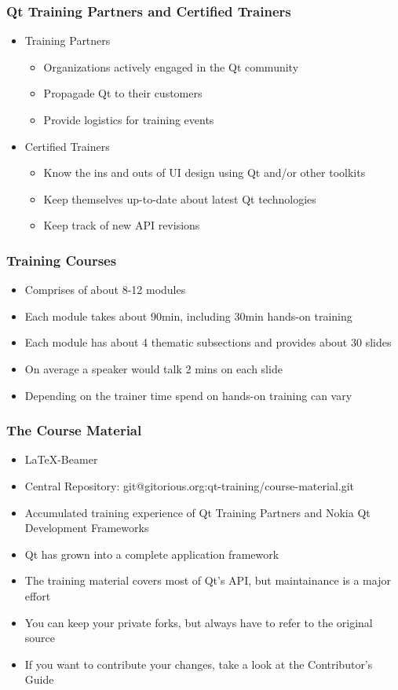 \begin{slide}
  \frametitle{Qt Training Partners and Certified Trainers}
  \begin{itemize}
    \item Training Partners
    \begin{itemize}
      \item Organizations actively engaged in the Qt community
      \item Propagade Qt to their customers
      \item Provide logistics for training events
    \end{itemize}
    \item Certified Trainers
    \begin{itemize}
      \item Know the ins and outs of UI design using Qt and/or other toolkits
      \item Keep themselves up-to-date about latest Qt technologies
      \item Keep track of new API revisions
    \end{itemize}
  \end{itemize}
\end{slide}

\begin{slide}
  \frametitle{Training Courses}
  \begin{itemize}
    \item Comprises of about 8-12 modules
    \item Each module takes about 90min, including 30min hands-on training
    \item Each module has about 4 thematic subsections and provides about 30 slides
    \item On average a speaker would talk 2 mins on each slide
    \item Depending on the trainer time spend on hands-on training can vary
  \end{itemize}
\end{slide}

\begin{slide}
  \frametitle{The Course Material}
  \begin{itemize}
    \item \LaTeX-Beamer
    \item Central Repository: git@gitorious.org:qt-training/course-material.git
    \item Accumulated training experience of Qt Training Partners and Nokia Qt Development Frameworks
    \item Qt has grown into a complete application framework
    \item The training material covers most of Qt's API, but maintainance is a major effort
    \item You can keep your private forks, but always have to refer to the original source
    \item If you want to contribute your changes, take a look at the Contributor's Guide
  \end{itemize}
\end{slide}
